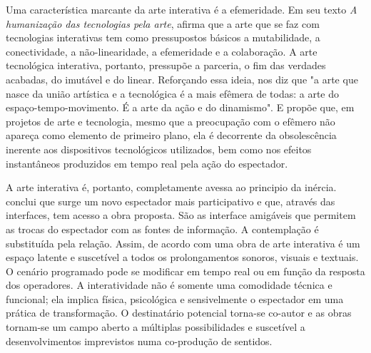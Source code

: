 Uma característica marcante da arte interativa é a efemeridade. Em seu texto \textit{A humanização das tecnologias pela arte},  afirma que a arte que se faz com tecnologias interativas tem como pressupostos básicos a mutabilidade, a conectividade, a não-linearidade, a efemeridade e a colaboração. A arte tecnológica interativa, portanto, pressupõe a parceria, o fim das verdades acabadas, do imutável e do linear. Reforçando essa ideia,  nos diz que "a arte que nasce da união artística e a tecnológica é a mais efêmera de todas: a arte do espaço-tempo-movimento. É a arte da ação e do dinamismo". E  propõe que, em projetos de arte e tecnologia, mesmo que a preocupação com o efêmero não apareça como elemento de primeiro plano, ela é decorrente da obsolescência inerente aos dispositivos tecnológicos utilizados, bem como nos efeitos instantâneos produzidos em tempo real pela ação do espectador.

A arte interativa é, portanto, completamente avessa ao principio da inércia.  conclui que surge um novo espectador mais participativo e que, através das interfaces, tem acesso a obra proposta. São as interface amigáveis que permitem as trocas do espectador com as fontes de informação. A contemplação é substituída pela relação. Assim, de acordo com  uma obra de arte interativa é um espaço latente e suscetível a todos os prolongamentos sonoros, visuais e textuais. O cenário programado pode se modificar em tempo real ou em função da resposta dos operadores. A interatividade não é somente uma comodidade técnica e funcional; ela implica física, psicológica e sensivelmente o espectador em uma prática de transformação. O destinatário potencial torna-se co-autor e as obras tornam-se um campo aberto a múltiplas possibilidades e suscetível a desenvolvimentos imprevistos numa co-produção de sentidos.		
